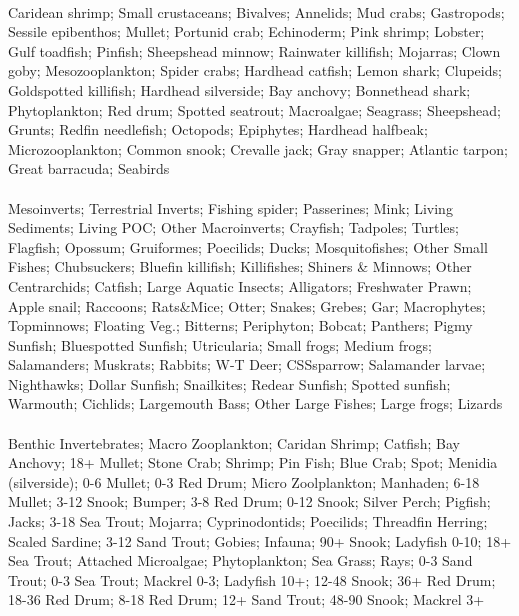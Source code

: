 \fullhline
\hline
{} \\
\hline
Caridean shrimp; Small crustaceans; Bivalves; Annelids; Mud crabs; Gastropods; Sessile epibenthos; Mullet; Portunid crab; Echinoderm; Pink shrimp; Lobster; Gulf toadfish; Pinfish; Sheepshead minnow; Rainwater killifish; Mojarras; Clown goby; Mesozooplankton; Spider crabs; Hardhead catfish; Lemon shark; Clupeids; Goldspotted killifish; Hardhead silverside; Bay anchovy; Bonnethead shark; Phytoplankton; Red drum; Spotted seatrout; Macroalgae; Seagrass; Sheepshead; Grunts; Redfin needlefish; Octopods; Epiphytes; Hardhead halfbeak; Microzooplankton; Common snook; Crevalle jack; Gray snapper; Atlantic tarpon; Great barracuda; Seabirds\\
\fullhline
\hline
{} \\
\hline
Mesoinverts; Terrestrial Inverts; Fishing spider; Passerines; Mink; Living Sediments; Living POC; Other Macroinverts; Crayfish; Tadpoles; Turtles; Flagfish; Opossum; Gruiformes; Poecilids; Ducks; Mosquitofishes; Other Small Fishes; Chubsuckers; Bluefin killifish; Killifishes; Shiners \& Minnows; Other Centrarchids; Catfish; Large Aquatic Insects; Alligators; Freshwater Prawn; Apple snail; Raccoons; Rats\&Mice; Otter; Snakes; Grebes; Gar; Macrophytes; Topminnows; Floating Veg.; Bitterns; Periphyton; Bobcat; Panthers; Pigmy Sunfish; Bluespotted Sunfish; Utricularia; Small frogs; Medium frogs; Salamanders; Muskrats; Rabbits; W-T Deer; CSSsparrow; Salamander larvae; Nighthawks; Dollar Sunfish; Snailkites; Redear Sunfish; Spotted sunfish; Warmouth; Cichlids; Largemouth Bass; Other Large Fishes; Large frogs; Lizards\\
\fullhline
\hline
{} \\
\hline
Benthic Invertebrates; Macro Zooplankton; Caridan Shrimp; Catfish; Bay Anchovy; 18+ Mullet; Stone Crab; Shrimp; Pin Fish; Blue Crab; Spot; Menidia (silverside); 0-6 Mullet; 0-3 Red Drum; Micro Zoolplankton; Manhaden; 6-18 Mullet; 3-12 Snook; Bumper; 3-8 Red Drum; 0-12 Snook; Silver Perch; Pigfish; Jacks; 3-18 Sea Trout; Mojarra; Cyprinodontids; Poecilids; Threadfin Herring; Scaled Sardine; 3-12 Sand Trout; Gobies; Infauna; 90+ Snook; Ladyfish 0-10; 18+ Sea Trout; Attached Microalgae; Phytoplankton; Sea Grass; Rays; 0-3 Sand Trout; 0-3 Sea Trout; Mackrel 0-3; Ladyfish 10+; 12-48 Snook; 36+ Red Drum; 18-36 Red Drum; 8-18 Red Drum; 12+ Sand Trout; 48-90 Snook; Mackrel 3+\\
